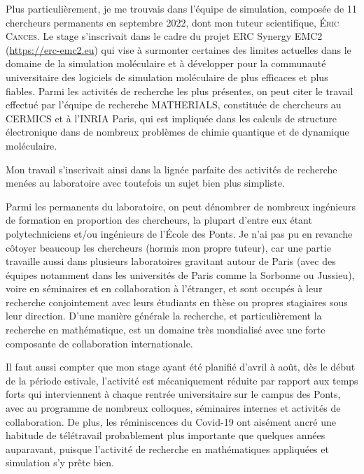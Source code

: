 \documentclass[svgnames,dvipsnames,a4paper,10pt,french]{report}
\begin{document}
Plus particulièrement, je me trouvais dans l'équipe de simulation, composée de 11 chercheurs permanents en septembre 2022, dont mon tuteur scientifique, \textsc{Éric Cances}. Le stage s’inscrivait dans le cadre du projet ERC Synergy EMC2 (\url{https://erc-emc2.eu}) qui vise à surmonter certaines des limites actuelles dans le domaine de la simulation moléculaire et à développer pour la communauté universitaire des logiciels de simulation moléculaire de plus efficaces et plus fiables. Parmi les activités de recherche les plus présentes, on peut citer le travail effectué par l'équipe de recherche MATHERIALS, constituée de chercheurs au CERMICS et à l'INRIA Paris, qui est impliquée dans les calculs de structure électronique dans de nombreux problèmes de  chimie quantique et de dynamique moléculaire.

Mon travail s'inscrivait ainsi dans la lignée parfaite des activités de recherche menées au laboratoire avec toutefois un sujet bien plus simpliste.

Parmi les permanents du laboratoire, on peut dénombrer de nombreux ingénieurs de formation en proportion des chercheurs, la plupart d'entre eux étant polytechniciens et/ou ingénieurs de l'École des Ponts. Je n'ai pas pu en revanche côtoyer beaucoup les chercheurs (hormis mon propre tuteur), car une partie travaille aussi dans plusieurs laboratoires gravitant autour de Paris (avec des équipes notamment dans les universités de Paris comme la Sorbonne ou Jussieu), voire en séminaires et en collaboration à l'étranger, et sont occupés à leur recherche conjointement avec leurs étudiants en thèse ou propres stagiaires sous leur direction. D'une manière générale la recherche, et particulièrement la recherche en mathématique, est un domaine très mondialisé avec une forte composante de collaboration internationale.

Il faut aussi compter que mon stage ayant été planifié d'avril à août, dès le début de la période estivale, l'activité est mécaniquement réduite par rapport aux temps forts qui interviennent à chaque rentrée universitaire sur le campus des Ponts, avec au programme de nombreux colloques, séminaires internes et activités de collaboration. De plus, les réminiscences du Covid-19 ont aisément ancré une habitude de télétravail probablement plus importante que quelques années auparavant, puisque l'activité de recherche en mathématiques appliquées et simulation s'y prête bien.
\end{document}
